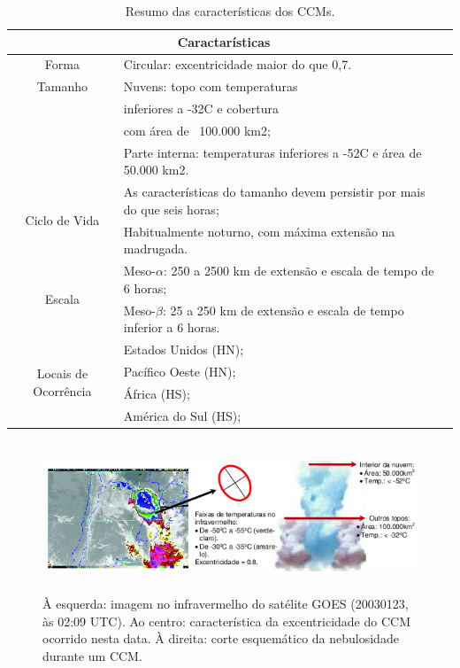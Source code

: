 \begin{table}
\caption{Resumo das características dos CCMs.}
\label{tab03}
\centering
\begin{tabular}{c|p{12cm}l}
\hline
\multicolumn{2}{c}{Caractarísticas}                                                 \\
\hline
Forma                                       & Circular: excentricidade maior do que 0,7.\\
\hline
Tamanho                                     & Nuvens: topo com temperaturas \\
                                            & inferiores a -32C e cobertura \\
                                            & com área de ~100.000 km2; \\
                                            & Parte interna: temperaturas inferiores a -52C e área de 50.000 km2.         \\
\hline
\multirow{2}{2cm}{Ciclo de Vida}            & As características do tamanho devem persistir por mais do que seis horas;   \\
                                            & Habitualmente noturno, com máxima extensão na madrugada.                \\
\hline
\multirow{2}{2cm}{Escala}                   & Meso-$\alpha$: 250 a 2500 km de extensão e escala de tempo de 6 horas;      \\
                                            & Meso-$\beta$: 25 a 250 km de extensão e escala de tempo inferior a 6 horas. \\
\hline
\multirow{4}{2cm}{Locais de Ocorrência} & Estados Unidos (HN);                  \\
                                            & Pacífico Oeste (HN);              \\
                                            & África (HS);                      \\
                                            & América do Sul (HS);              \\
\hline
\end{tabular}
\end{table}

\begin{figure}
\centering
\includegraphics[height=4.5cm]{./figs/fig08.png}
\caption{À esquerda: imagem no infravermelho do satélite GOES (20030123, às 02:09 UTC). Ao centro: característica da excentricidade do CCM ocorrido nesta data. À direita: corte esquemático da nebulosidade durante um CCM.}
\label{fig08}
\end{figure}

